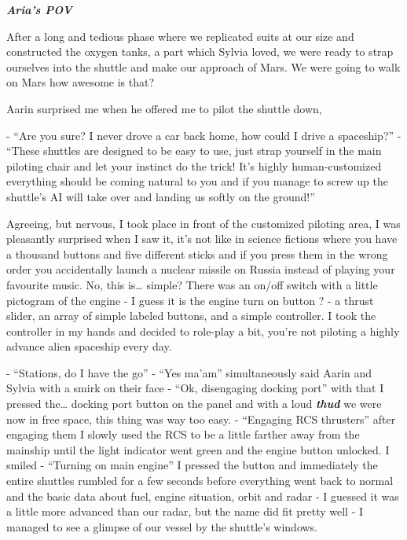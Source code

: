 \documentclass[colorlinks,12pt,a4paper]{book}
\begin{document}
\textit{\textbf{Aria's POV}}\par
\bigskip

After a long and tedious phase where we replicated suits at our size and constructed the oxygen tanks, 
a part which Sylvia loved, we were ready to strap ourselves into the shuttle and make our approach of Mars. 
We were going to walk on Mars how awesome is that? \par
\bigskip


Aarin surprised me when he offered me to pilot the shuttle down,\par
\bigskip

- “Are you sure? I never drove a car back home, how could I drive a spaceship?”\newline
- “These shuttles are designed to be easy to use, just strap yourself in the main piloting chair and let your 
instinct do the trick! It's highly human-customized everything should be coming natural to you and if you manage 
to screw up the shuttle's AI will take over and landing us softly on the ground!”\par
\bigskip

Agreeing, but nervous, I took place in front of the customized piloting area, I was pleasantly 
surprised when I saw it, it's not like in science fictions where you have a thousand buttons and five 
different sticks and if you press them in the wrong order you accidentally launch a nuclear missile on Russia 
instead of playing your favourite music. No, this is… simple? There was an on/off switch with a little pictogram 
of the engine - I guess it is the engine turn on button ? - a thrust slider, an array of simple labeled buttons,
 and a simple controller. I took the controller in my hands and decided to role-play a bit, you're not piloting 
 a highly advance alien spaceship every day.\par
 \bigskip

- “Stations, do I have the go”\newline
- “Yes ma'am” simultaneously said Aarin and Sylvia with a smirk on their face\newline
- “Ok, disengaging docking port” with that I pressed the… docking port button on the panel and 
 with a loud \textit{\textbf{thud}} we were now in free space, this thing was way too easy.\newline
- “Engaging RCS thrusters” after engaging them I slowly used the RCS to be a little farther away 
 from the mainship until the light indicator went green and the engine button unlocked. I smiled\newline
- “Turning on main engine” I pressed the button and immediately the entire shuttles rumbled 
 for a few seconds before everything went back to normal and the basic data about fuel, 
 engine situation, orbit and radar - I guessed it was a little more advanced than our 
 radar, but the name did fit pretty well - I managed to see a glimpse of our vessel by the shuttle's windows.\par
 \bigskip
\end{document}
